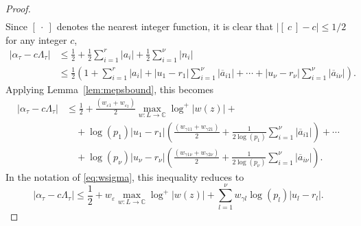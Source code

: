 \documentclass[11pt]{report}
\theoremstyle{definition}
\newcommand{\eps}{\varepsilon}
\begin{document}
\begin{proof}
\begin{align*}
\end{align*}
Since $[ \ \cdot \ ]$ denotes the nearest integer function, it is clear that $|[ \ c \ ] - c| \leq 1/2$ for any integer $c$,
\begin{align*}
|\alpha_{\tau}-c\Lambda_\tau|
	& \leq \frac{1}{2} + \frac{1}{2}\sum_{i = 1}^r |a_i| + \frac{1}{2}\sum_{i = 1}^{\nu} |n_i|\\
	& \leq \frac{1}{2}\left(1 + \sum_{i = 1}^r |a_i| + |u_1-r_1|\sum_{i=1}^{\nu}|\overline{a}_{i1}| + \cdots + |u_{\nu} - r_{\nu}| \sum_{i=1}^{\nu}|\overline{a}_{i\nu}|\right).
\end{align*}
Applying Lemma~\ref{lem:mepsbound}, this becomes
\begin{align*}
|\alpha_{\tau}-c\Lambda_\tau|
	& \leq \frac{1}{2} + \frac{(w_{\varepsilon 1} + w_{\varepsilon_2})}{2}\max_{w :L \to \mathbb{C}} \log^+|w(z)| + \\
	& \quad + \log(p_1)|u_1 - r_1|\left( \frac{(w_{\gamma 1 1} + w_{\gamma 2 1})}{2} + \frac{1}{2\log(p_1)}\sum_{i=1}^{\nu}|\overline{a}_{i1}|\right) + \cdots \\
	& \quad + \log(p_{\nu})|u_{\nu} - r_{\nu}|\left( \frac{(w_{\gamma 1 {\nu}} + w_{\gamma 2 {\nu}})}{2} + \frac{1}{2\log(p_{\nu})}\sum_{i=1}^{\nu}|\overline{a}_{i{\nu}}|\right).
\end{align*}
In the notation of \eqref{eq:wsigma}, this inequality reduces to
\[|\alpha_{\tau}-c\Lambda_\tau| \leq \frac{1}{2} + w_{\eps} \max_{w :L \to \mathbb{C}}\log^+|w(z)| + \sum_{l = 1}^{\nu}w_{\gamma l} \log(p_l)|u_l - r_l|.\]


\end{proof}
\end{document}
